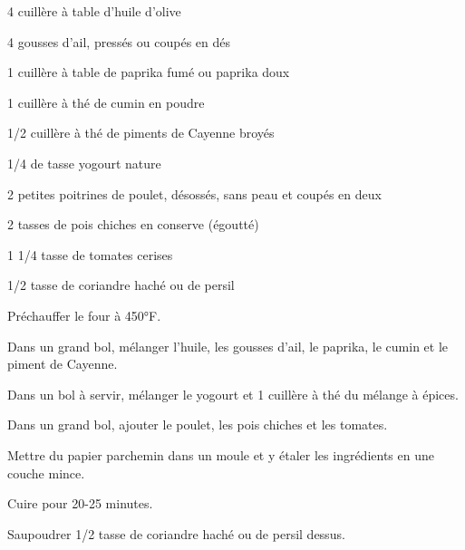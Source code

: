 


\totaltime{}


\begin{ingredients}
    \item 4 cuillère à table d’huile d’olive
    \item 4 gousses d’ail, pressés ou coupés en dés
    \item 1 cuillère à table de paprika fumé ou paprika doux
    \item 1 cuillère à thé de cumin en poudre
    \item 1/2 cuillère à thé de piments de Cayenne broyés
    \item 1/4 de tasse yogourt nature
    \item 2 petites poitrines de poulet, désossés, sans peau et coupés en deux
    \item 2 tasses de pois chiches en conserve (égoutté)
    \item 1 1/4 tasse de tomates cerises
    \item 1/2 tasse de coriandre haché ou de persil
\end{ingredients}

\begin{steps}
    \item Préchauffer le four à 450°F.
    \item Dans un grand bol, mélanger l’huile, les gousses d’ail, le paprika, le cumin et le piment de Cayenne.
    \item Dans un bol à servir, mélanger le yogourt et 1 cuillère à thé du mélange à épices.
    \item Dans un grand bol, ajouter le poulet, les pois chiches et les tomates.
    \item Mettre du papier parchemin dans un moule et y étaler les ingrédients en une couche mince.
    \item Cuire pour 20-25 minutes.
    \item Saupoudrer 1/2 tasse de coriandre haché ou de persil dessus.
\end{steps}
